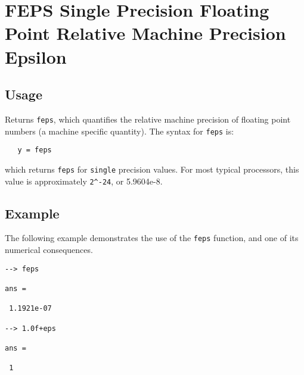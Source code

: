 \section{FEPS Single Precision Floating Point Relative Machine Precision Epsilon}

\subsection{Usage}

Returns \verb|feps|, which quantifies the relative machine precision
of floating point numbers (a machine specific quantity).  The syntax
for \verb|feps| is:
\begin{verbatim}
   y = feps
\end{verbatim}
which returns \verb|feps| for \verb|single| precision values. For most
typical processors, this value is approximately \verb|2^-24|, or 5.9604e-8.
\subsection{Example}

The following example demonstrates the use of the \verb|feps| function,
and one of its numerical consequences.
\begin{verbatim}
--> feps

ans = 

 1.1921e-07 

--> 1.0f+eps

ans = 

 1 
\end{verbatim}
